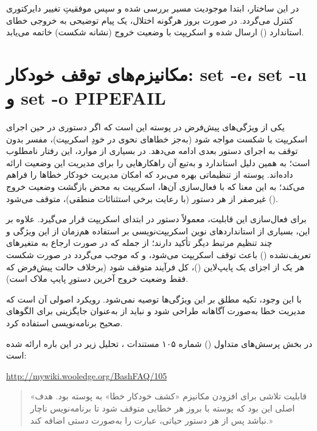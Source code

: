 در این ساختار، ابتدا موجودیت مسیر بررسی شده و سپس موفقیتِ تغییر دایرکتوری کنترل می‌گردد. در صورت بروز هرگونه اختلال، یک پیام توضیحی به خروجی خطای استاندارد () ارسال شده و اسکریپت با وضعیت خروج  (نشانه شکست) خاتمه می‌یابد.

\section{مکانیزم‌های توقف خودکار: set -e، set -u و set -o PIPEFAIL}

یکی از ویژگی‌های پیش‌فرض در پوسته  این است که اگر دستوری در حین اجرای اسکریپت با شکست مواجه شود (به‌جز خطاهای نحوی در خودِ اسکریپت)، مفسر بدون توقف به اجرای دستور بعدی ادامه می‌دهد. در بسیاری از موارد، این رفتار نامطلوب است؛ به همین دلیل استاندارد  و به‌تبع آن  راهکارهایی را برای مدیریت این وضعیت ارائه داده‌اند. پوسته  از تنظیماتی بهره می‌برد که امکان مدیریت خودکار خطاها را فراهم می‌کند؛ به این معنا که با فعال‌سازی آن‌ها، اسکریپت به محض بازگشت وضعیت خروج () غیرصفر از هر دستور (با رعایت برخی استثنائات منطقی)، متوقف می‌شود.

برای فعال‌سازی این قابلیت، معمولاً دستور  در ابتدای اسکریپت قرار می‌گیرد. علاوه بر این، بسیاری از استانداردهای نوین اسکریپت‌نویسی بر استفاده هم‌زمان از این ویژگی و چند تنظیم مرتبط دیگر تأکید دارند؛ از جمله  که در صورت ارجاع به متغیرهای تعریف‌نشده () باعث توقف اسکریپت می‌شود، و  که موجب می‌گردد در صورت شکست هر یک از اجزای یک پایپ‌لاین ()، کل فرآیند متوقف شود (برخلاف حالت پیش‌فرض که فقط وضعیت خروج آخرین دستورِ پایپ ملاک است).

با این وجود، تکیه مطلق بر این ویژگی‌ها توصیه نمی‌شود. رویکرد اصولی آن است که مدیریت خطا به‌صورت آگاهانه طراحی شود و نباید از  به‌عنوان جایگزینی برای الگوهای صحیح برنامه‌نویسی استفاده کرد.

در بخش پرسش‌های متداول () شماره ۱۰۵ مستندات ، تحلیل زیر در این باره ارائه شده است:

\begin{latin}
\url{http://mywiki.wooledge.org/BashFAQ/105}
\end{latin}

\begin{quote}
«قابلیت  تلاشی برای افزودن مکانیزم «کشف خودکار خطا» به پوسته بود. هدف اصلی این بود که پوسته با بروز هر خطایی متوقف شود تا برنامه‌نویس ناچار نباشد پس از هر دستور حیاتی، عبارت  را به‌صورت دستی اضافه کند.»
\end{quote}

